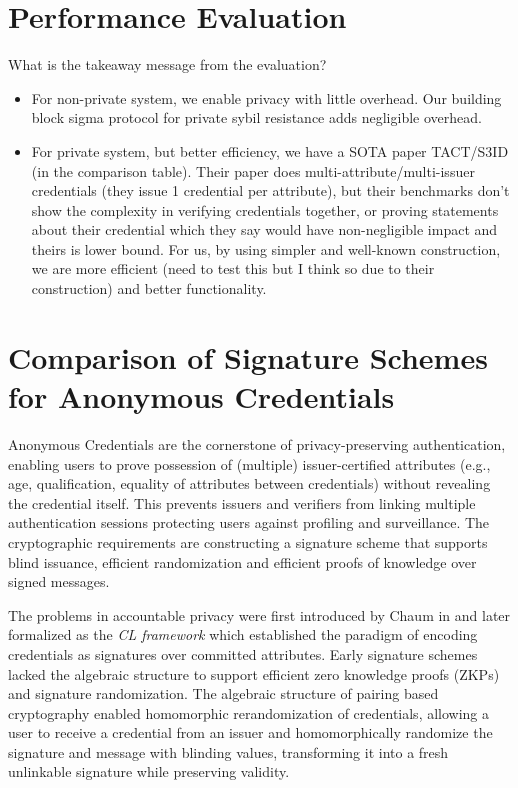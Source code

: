 {\section{Performance Evaluation}\label{sec:evaluation}
What is the takeaway message from the evaluation?
\begin{itemize}
    \item For non-private system, we enable privacy with little overhead. Our building block sigma protocol for private sybil resistance adds negligible overhead. 
    \item For private system, but better efficiency, we have a SOTA paper TACT/S3ID (in the comparison table). Their paper does multi-attribute/multi-issuer credentials (they issue 1 credential per attribute), but their benchmarks don't show the complexity in verifying credentials together, or proving statements about their credential which they say would have non-negligible impact and theirs is lower bound. For us, by using simpler and well-known construction, we are more efficient (need to test this but I think so due to their construction) and better functionality. 
\end{itemize}








\newpage
\section{Comparison of Signature Schemes for Anonymous Credentials}

Anonymous Credentials are the cornerstone of privacy-preserving authentication, enabling users to prove possession of (multiple) issuer-certified attributes (e.g., age, qualification, equality of attributes between credentials) without revealing the credential itself. This prevents issuers and verifiers from linking multiple authentication sessions protecting users against profiling and surveillance. The cryptographic requirements are constructing a signature scheme that supports blind issuance, efficient randomization and efficient proofs of knowledge over signed messages.

The problems in accountable privacy were first introduced by Chaum in \cite{chaum_untraceable_1981, chaum1985security} and later formalized as the \emph{CL framework} \cite{goos_pseudonym_2000, goos_efficient_2001} which established the paradigm of encoding credentials as signatures over committed attributes. Early signature schemes lacked the algebraic structure to support efficient zero knowledge proofs (ZKPs) and signature randomization. The algebraic structure of pairing based cryptography enabled homomorphic rerandomization of credentials, allowing a user to receive a credential from an issuer and homomorphically randomize the signature and message with blinding values, transforming it into a fresh unlinkable signature while preserving validity. 

}
